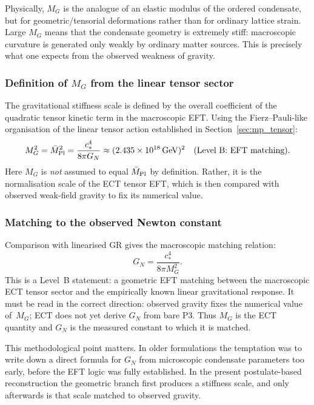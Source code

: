 Physically, $M_G$ is the analogue of an elastic modulus of the ordered
condensate, but for geometric/tensorial deformations rather than for
ordinary lattice strain.
Large $M_G$ means that the condensate geometry is extremely stiff:
macroscopic curvature is generated only weakly by ordinary matter sources.
This is precisely what one expects from the observed weakness of gravity.

\subsubsection*{Definition of $M_G$ from the linear tensor sector}

The gravitational stiffness scale is defined by the overall coefficient
of the quadratic tensor kinetic term in the macroscopic EFT.
Using the Fierz--Pauli-like organisation of the linear tensor action
established in Section~\ref{sec:mp_tensor}:
\begin{equation}
  \label{eq:MG_def}
  M_G^2 = \bar M_{\rm Pl}^2
  = \frac{c_*^4}{8\pi G_N}
  \approx (2.435\times 10^{18}\,\text{GeV})^2
  \quad\text{(Level~B: EFT matching)}.
\end{equation}
Here $M_G$ is \emph{not} assumed to equal $\bar M_{\rm Pl}$ by definition.
Rather, it is the normalisation scale of the ECT tensor EFT, which is
then compared with observed weak-field gravity to fix its numerical value.

\subsubsection*{Matching to the observed Newton constant}

Comparison with linearised GR gives the macroscopic matching relation:
\begin{equation}
  \label{eq:GN_from_MG}
  G_N = \frac{c_*^4}{8\pi M_G^2}.
\end{equation}
This is a Level~B statement: a geometric EFT matching between the
macroscopic ECT tensor sector and the empirically known linear
gravitational response.
It must be read in the correct direction: observed gravity fixes the
numerical value of~$M_G$; ECT does not yet derive $G_N$ from bare P3.
Thus $M_G$ is the ECT quantity and $G_N$ is the measured constant
to which it is matched.

This methodological point matters.
In older formulations the temptation was to write down a direct formula
for $G_N$ from microscopic condensate parameters too early, before the
EFT logic was fully established.
In the present postulate-based reconstruction the geometric branch first
produces a stiffness scale, and only afterwards is that scale matched
to observed gravity.

